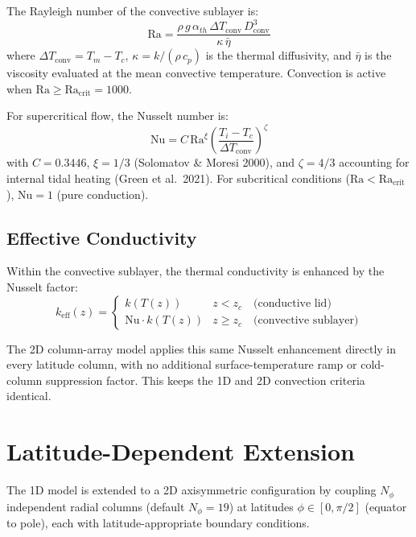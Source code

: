 \documentclass[11pt,a4paper]{article}
\newcommand{\Ra}{\mathrm{Ra}}
\newcommand{\Nu}{\mathrm{Nu}}
\begin{document}
The Rayleigh number of the convective sublayer is:
\begin{equation}
\Ra = \frac{\rho\,g\,\alpha_{th}\,\Delta T_{\mathrm{conv}}\,
  D_{\mathrm{conv}}^3}{\kappa\,\bar{\eta}}
\label{eq:Ra}
\end{equation}
where $\Delta T_{\mathrm{conv}} = T_m - T_c$, $\kappa = k/(\rho\,c_p)$
is the thermal diffusivity, and $\bar{\eta}$ is the viscosity evaluated
at the mean convective temperature. Convection is active when
$\Ra \geq \Ra_{\mathrm{crit}} = 1000$.

For supercritical flow, the Nusselt number is:
\begin{equation}
\Nu = C\,\Ra^{\xi}\left(\frac{T_i - T_c}{\Delta T_{\mathrm{conv}}}\right)^{\!\zeta}
\label{eq:Nu}
\end{equation}
with $C = 0.3446$, $\xi = 1/3$ (Solomatov \& Moresi 2000), and
$\zeta = 4/3$ accounting for internal tidal heating
(Green et al.\ 2021). For subcritical conditions ($\Ra < \Ra_{\mathrm{crit}}$),
$\Nu = 1$ (pure conduction).

\subsection{Effective Conductivity}

Within the convective sublayer, the thermal conductivity is enhanced
by the Nusselt factor:
\begin{equation}
k_{\mathrm{eff}}(z) = \begin{cases}
  k(T(z))            & z < z_c \quad \text{(conductive lid)} \\
  \Nu \cdot k(T(z))  & z \geq z_c \quad \text{(convective sublayer)}
\end{cases}
\label{eq:keff}
\end{equation}

The 2D column-array model applies this same Nusselt enhancement
directly in every latitude column, with no additional surface-temperature
ramp or cold-column suppression factor. This keeps the 1D and 2D
convection criteria identical.

\section{Latitude-Dependent Extension}
\label{sec:2d}

The 1D model is extended to a 2D axisymmetric configuration by
coupling $N_\phi$ independent radial columns (default $N_\phi = 19$)
at latitudes $\phi \in [0, \pi/2]$ (equator to pole), each with
latitude-appropriate boundary conditions.
\end{document}

